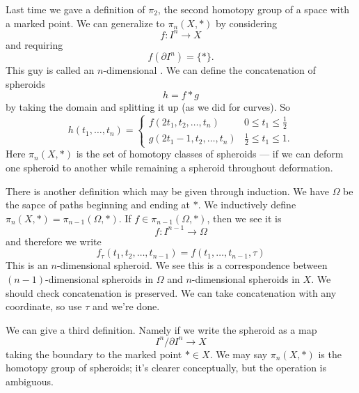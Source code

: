 Last time we gave a definition of $\pi_{2}$, the second homotopy
group of a space with a marked point. We can generalize to
$\pi_{n}(X,*)$ by considering
\begin{equation}
f\colon I^n\to X
\end{equation}
and requiring
\begin{equation}
f(\partial I^{n})=\{*\}.
\end{equation}
This guy is called an $n$-dimensional . We can
define the concatenation of spheroids
\begin{equation}
h=f*g
\end{equation}
by taking the domain and splitting it up (as we did for
curves). So
\begin{equation}
h(t_1,\dots,t_n) = \begin{cases}
f(2t_1,t_2,\dots,t_n) & 0\leq t_1\leq\frac{1}{2}\\
g(2t_1-1,t_2,\dots,t_n) & \frac{1}{2}\leq t_1\leq1.
\end{cases}
\end{equation}
Here $\pi_{n}(X,*)$ is the set of homotopy classes of spheroids
--- if we can deform one spheroid to another while remaining a
spheroid throughout deformation.

There is another definition which may be given through
induction. We have $\Omega$ be the sapce of paths beginning and
ending at $*$. We inductively define
$\pi_{n}(X,*)=\pi_{n-1}(\Omega,*)$. If $f\in\pi_{n-1}(\Omega,*)$,
then we see it is
\begin{equation}
f\colon I^{n-1}\to\Omega
\end{equation}
and therefore we write
\begin{equation*}
f_{\tau}(t_1,t_2,\dots,t_{n-1})=f(t_1,\dots,t_{n-1},\tau)
\end{equation*}
This is an $n$-dimensional spheroid. We see this is a
correspondence between $(n-1)$-dimensional spheroids in $\Omega$
and $n$-dimensional spheroids in $X$.
We should check concatenation is preserved. We can take
concatenation with any coordinate, so use $\tau$ and we're done.

We can give a third definition. Namely if we write the spheroid
as a map
\begin{equation}
I^{n}/\partial I^{n}\to X
\end{equation}
taking the boundary to the marked point $*\in X$. We may say
$\pi_{n}(X,*)$ is the homotopy group of spheroids; it's clearer
conceptually, but the operation is ambiguous.

